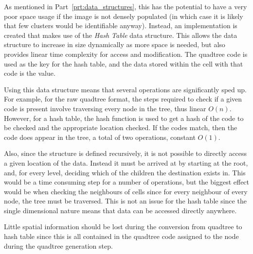 As mentioned in Part~\ref{prt:data_structures}, this has the potential to
have a very poor space usage if the image is not densely populated (in which
case it is likely that few clusters would be identifiable anyway). Instead, an
implementation is created that makes use of the \emph{Hash Table} data
structure\cite{cormen2001introduction}. This allows the data structure to
increase in size dynamically as more space is needed, but also provides linear
time complexity for access and modification. The quadtree code is used as the
key for the hash table, and the data stored within the cell with that code is
the value.

Using this data structure means that several operations are significantly sped
up. For example, for the raw quadtree format, the steps required to check if a
given code is present involve traversing every node in the tree, thus linear
$O(n)$.  However, for a hash table, the hash function is used to get a hash of
the code to be checked and the appropriate location checked. If the codes
match, then the code does appear in the tree, a total of two operations,
constant $O(1)$.

Also, since the structure is defined recursively, it is not possible to
directly access a given location of the data. Instead it must be arrived at by
starting at the root, and, for every level, deciding which of the children the
destination exists in. This would be a time consuming step for a number of
operations, but the biggest effect would be when checking the neighbours of
cells since for every neighbour of every node, the tree must be traversed. This
is not an issue for the hash table since the single dimensional nature means
that data can be accessed directly anywhere.

Little spatial information should be lost during the conversion from quadtree
to hash table since this is all contained in the quadtree code assigned to the
node during the quadtree generation step.

